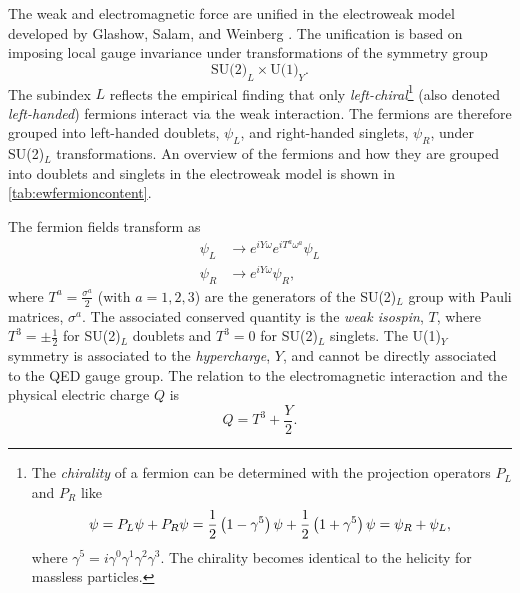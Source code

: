 The weak and electromagnetic force are unified in the electroweak model developed by Glashow, Salam, and Weinberg .
The unification is based on imposing local gauge invariance under transformations of the symmetry group
\begin{equation}
  \text{SU(2)}_L \times \text{U(1)}_Y.
\end{equation}
The subindex $L$ reflects the empirical finding that only \emph{left-chiral}\footnote{
  The \emph{chirality} of a fermion can be determined with the projection operators $P_L$ and $P_R$ like
  \begin{equation*}
    \psi       = P_L \psi + P_R \psi = \frac{1}{2} \left( 1 - \gamma^5 \right) \psi + \frac{1}{2} \left( 1 + \gamma^5 \right) \psi = \psi_R + \psi_L,                                \\
  \end{equation*}
  where $\gamma^5 = i\gamma^0\gamma^1\gamma^2\gamma^3$. The chirality becomes identical to the helicity for massless particles.
} (also denoted \emph{left-handed}) fermions interact via the weak interaction.
The fermions are therefore grouped into left-handed doublets, $\psi_L$, and right-handed singlets, $\psi_R$, under SU(2)$_L$ transformations. An overview of the fermions and how they are grouped into doublets and singlets in the electroweak model is shown in \cref{tab:ewfermioncontent}.

The fermion fields transform as
\begin{align}
  \psi_L & \rightarrow e^{iY\omega} e^{iT^a\omega^a} \psi_L \\
  \psi_R & \rightarrow e^{iY\omega} \psi_R,
\end{align}
where $T^a = \frac{\sigma^a}{2}$ (with $a = 1, 2, 3$) are the generators of the SU(2)$_L$ group with Pauli matrices, $\sigma^a$.
The associated conserved quantity is the \emph{weak isospin}, $T$, where $T^3 = \pm \frac{1}{2}$ for SU(2)$_L$ doublets and $T^3 = 0$ for SU(2)$_L$ singlets.
The U(1)$_Y$ symmetry is associated to the \emph{hypercharge}, $Y$, and cannot be directly associated to the QED gauge group.
The relation to the electromagnetic interaction and the physical electric charge $Q$ is
\begin{equation}
  Q = T^3 + \frac{Y}{2}.
\end{equation}

